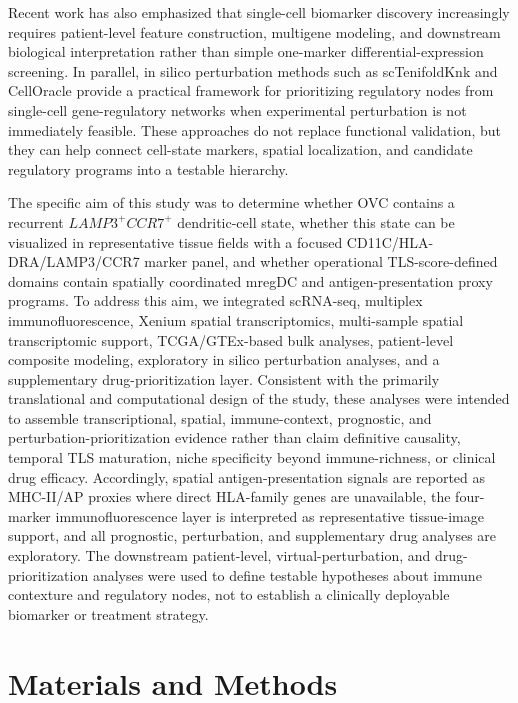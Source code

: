 \documentclass[cancers,article,submit,pdftex,moreauthors]{Definitions/mdpi}
\begin{document}
Recent work has also emphasized that single-cell biomarker discovery increasingly requires patient-level feature construction, multigene modeling, and downstream biological interpretation rather than simple one-marker differential-expression screening\cite{bib112}. In parallel, in silico perturbation methods such as scTenifoldKnk and CellOracle provide a practical framework for prioritizing regulatory nodes from single-cell gene-regulatory networks when experimental perturbation is not immediately feasible\cite{bib113,bib114}. These approaches do not replace functional validation, but they can help connect cell-state markers, spatial localization, and candidate regulatory programs into a testable hierarchy.

The specific aim of this study was to determine whether OVC contains a recurrent $LAMP3^{+}CCR7^{+}$ dendritic-cell state, whether this state can be visualized in representative tissue fields with a focused CD11C/HLA-DRA/LAMP3/CCR7 marker panel, and whether operational TLS-score-defined domains contain spatially coordinated mregDC and antigen-presentation proxy programs. To address this aim, we integrated scRNA-seq, multiplex immunofluorescence, Xenium spatial transcriptomics, multi-sample spatial transcriptomic support, TCGA/GTEx-based bulk analyses, patient-level composite modeling, exploratory in silico perturbation analyses, and a supplementary drug-prioritization layer. Consistent with the primarily translational and computational design of the study, these analyses were intended to assemble transcriptional, spatial, immune-context, prognostic, and perturbation-prioritization evidence rather than claim definitive causality, temporal TLS maturation, niche specificity beyond immune-richness, or clinical drug efficacy. Accordingly, spatial antigen-presentation signals are reported as MHC-II/AP proxies where direct HLA-family genes are unavailable, the four-marker immunofluorescence layer is interpreted as representative tissue-image support, and all prognostic, perturbation, and supplementary drug analyses are exploratory. The downstream patient-level, virtual-perturbation, and drug-prioritization analyses were used to define testable hypotheses about immune contexture and regulatory nodes, not to establish a clinically deployable biomarker or treatment strategy.

\section{Materials and Methods}
\end{document}
